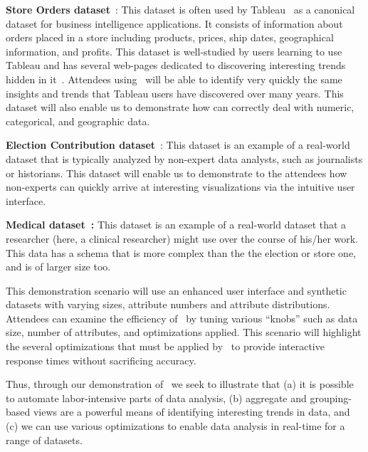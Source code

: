 \begin{denselist}
  \item {\bf Store Orders dataset}~\cite{superstore}: This dataset is
    often used by Tableau~\cite{tableau} as a canonical dataset for
    business intelligence applications. It consists of information
    about orders placed in a store including products, prices, ship
    dates, geographical information, and profits. This dataset
    is well-studied by users learning to use Tableau and has several
    web-pages dedicated to discovering interesting trends hidden in
    it~\cite{website}. Attendees using \SeeDB\ will be able
    to identify very quickly the same insights and trends that Tableau
    users have discovered over many years. This dataset will also
    enable us to demonstrate how \SeeDB can correctly deal with
    numeric, categorical, and geographic data.
  \item {\bf Election Contribution dataset}~\cite{election_data}: This dataset
  is an example of a real-world dataset that is typically analyzed by
    non-expert data analysts, such as journalists or historians. This
    dataset will enable us to demonstrate to the attendees how
    non-experts can quickly arrive at interesting visualizations via
    the intuitive user interface.
  \item {\bf Medical dataset~\cite{mimic}:} This dataset is an example of a
    real-world dataset that a researcher (here, a clinical researcher)
    might use over the course of his/her work. This data has a schema
    that is more complex than the the election or store one, and is of
    larger size too.  
\end{denselist}

 This demonstration
scenario will use an enhanced user interface and synthetic datasets with varying
sizes, attribute numbers and attribute distributions. Attendees can examine the
efficiency of \SeeDB\ by tuning various ``knobs'' such as data size, number of
attributes, and optimizations applied. This scenario will highlight the several
optimizations that must be applied by \SeeDB\ to provide interactive response
times without sacrificing accuracy.

Thus, through our demonstration of \SeeDB\, we seek to illustrate that (a) it is
possible to automate labor-intensive parts of data analysis, (b) aggregate
and grouping-based views are a powerful means of identifying interesting trends
in data, and (c) we can use various optimizations to enable data analysis in real-time for a range
of datasets.


